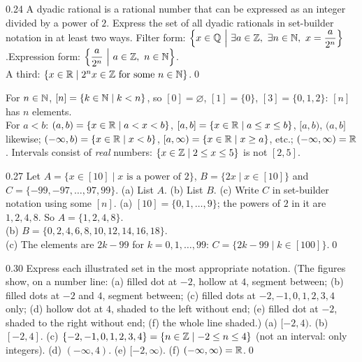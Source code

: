 \begin{bookex}[essential]{0.24}
A dyadic rational is a rational number that can be expressed as an integer divided by a power of $2$. Express the set of all dyadic rationals in set-builder notation in at least two ways.
\solution
Filter form: $\Big\{x\in\Q\ \Big|\ \exists a\in\Z,\ \exists n\in\N,\ x=\dfrac{a}{2^n}\Big\}$.\quad Expression form: $\Big\{\dfrac a{2^n}\ \Big|\ a\in\Z,\ n\in\N\Big\}$.\\
A third: $\{x\in\mathbb{R}\mid 2^nx\in\mathbb{Z}\text{ for some }n\in\mathbb{N}\}$.\qed
\end{bookex}

\begin{key}
For $n\in\mathbb{N}$, $[n]=\{k\in\mathbb{N}\mid k<n\}$, so $[0]=\varnothing$, $[1]=\{0\}$, $[3]=\{0,1,2\}$: $[n]$ has $n$ elements.\\
For $a<b$: $(a,b)=\{x\in\mathbb{R}\mid a<x<b\}$, $[a,b]=\{x\in\mathbb{R}\mid a\le x\le b\}$, $[a,b)$, $(a,b]$ likewise; $(-\infty,b)=\{x\in\mathbb{R}\mid x<b\}$, $[a,\infty)=\{x\in\mathbb{R}\mid x\ge a\}$, etc.; $(-\infty,\infty)=\mathbb{R}$. Intervals consist of \emph{real} numbers: $\{x\in\mathbb{Z}\mid 2\le x\le5\}$ is not $[2,5]$.
\end{key}

\begin{bookex}{0.27}
Let $A=\{x\in[10]\mid x\text{ is a power of }2\}$, $B=\{2x\mid x\in[10]\}$ and $C=\{-99,-97,\dots,97,99\}$. (a) List $A$. (b) List $B$. (c) Write $C$ in set-builder notation using some $[n]$.
\solution
(a) $[10]=\{0,1,\dots,9\}$; the powers of $2$ in it are $1,2,4,8$. So $A=\{1,2,4,8\}$.\\
(b) $B=\{0,2,4,6,8,10,12,14,16,18\}$.\\
(c) The elements are $2k-99$ for $k=0,1,\dots,99$: $C=\{2k-99\mid k\in[100]\}$.\qed
\end{bookex}

\begin{bookex}[recommended]{0.30}
Express each illustrated set in the most appropriate notation. (The figures show, on a number line: (a) filled dot at $-2$, hollow at $4$, segment between; (b) filled dots at $-2$ and $4$, segment between; (c) filled dots at $-2,-1,0,1,2,3,4$ only; (d) hollow dot at $4$, shaded to the left without end; (e) filled dot at $-2$, shaded to the right without end; (f) the whole line shaded.)
\solution
(a) $[-2,4)$. (b) $[-2,4]$. (c) $\{-2,-1,0,1,2,3,4\}=\{n\in\mathbb{Z}\mid-2\le n\le4\}$ (not an interval: only integers). (d) $(-\infty,4)$. (e) $[-2,\infty)$. (f) $(-\infty,\infty)=\mathbb{R}$.\qed
\end{bookex}

